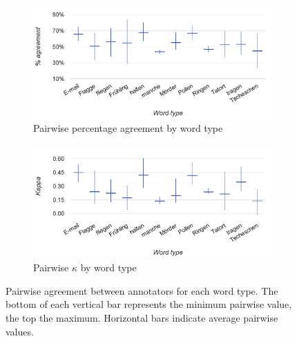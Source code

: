 		
		\begin{figure}[p]
			\centering
			
			\begin{subfigure}{\textwidth}
				\centering
				\includegraphics[width=\textwidth]{img/annotation/pairAgreeWords-noTitle2}
				\caption{Pairwise percentage agreement by word type}
				\label{fig:agreement:words:pct}
			\end{subfigure}%
			
			\vspace{1.5em}
			
			\begin{subfigure}{\textwidth}
				\centering
				\includegraphics[width=\textwidth]{img/annotation/pairKappaWords-noTitle2}
				\caption{Pairwise $\kappa$ by word type}
				\label{fig:agreement:words:k}
			\end{subfigure}%
			
			\vspace{1.5em}
			
			\caption[Pairwise agreement statistics by word type]{Pairwise agreement between annotators for each word type. 
			The bottom of each vertical bar represents the minimum pairwise value, the top the maximum. Horizontal bars indicate average pairwise values.
			}
			\label{fig:agreement:words}
		\end{figure}				
		
